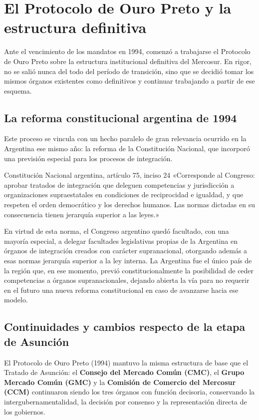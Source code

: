 \documentclass[12pt,oneside]{book}
\begin{document}
\section{El Protocolo de Ouro Preto y la estructura definitiva}

Ante el vencimiento de los mandatos en 1994, comenzó a trabajarse el Protocolo de Ouro Preto sobre la estructura institucional definitiva del Mercosur. En rigor, no se salió nunca del todo del período de transición, sino que se decidió tomar los mismos órganos existentes como definitivos y continuar trabajando a partir de ese esquema.

\subsection{La reforma constitucional argentina de 1994}

Este proceso se vincula con un hecho paralelo de gran relevancia ocurrido en la Argentina ese mismo año: la reforma de la Constitución Nacional, que incorporó una previsión especial para los procesos de integración.

\begin{normacitada}{Constitución Nacional argentina, artículo 75, inciso 24}
«Corresponde al Congreso: aprobar tratados de integración que deleguen competencias y jurisdicción a organizaciones supraestatales en condiciones de reciprocidad e igualdad, y que respeten el orden democrático y los derechos humanos. Las normas dictadas en su consecuencia tienen jerarquía superior a las leyes.»
\end{normacitada}

En virtud de esta norma, el Congreso argentino quedó facultado, con una mayoría especial, a delegar facultades legislativas propias de la Argentina en órganos de integración creados con carácter supranacional, otorgando además a esas normas jerarquía superior a la ley interna. La Argentina fue el único país de la región que, en ese momento, previó constitucionalmente la posibilidad de ceder competencias a órganos supranacionales, dejando abierta la vía para no requerir en el futuro una nueva reforma constitucional en caso de avanzarse hacia ese modelo.

\subsection{Continuidades y cambios respecto de la etapa de Asunción}

El Protocolo de Ouro Preto (1994) mantuvo la misma estructura de base que el Tratado de Asunción: el \textbf{Consejo del Mercado Común (CMC)}, el \textbf{Grupo Mercado Común (GMC)} y la \textbf{Comisión de Comercio del Mercosur (CCM)} continuaron siendo los tres órganos con función decisoria, conservando la intergubernamentalidad, la decisión por consenso y la representación directa de los gobiernos.
\end{document}
